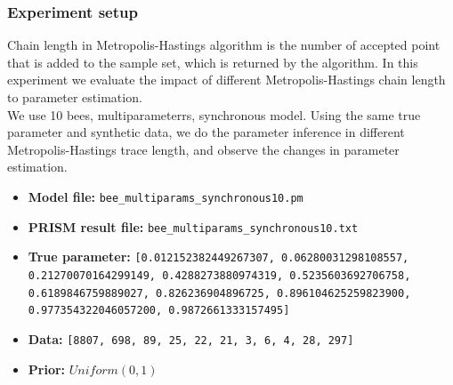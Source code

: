 \documentclass[12pt]{article}
\theoremstyle{definition}
\begin{document}
\subsubsection{Experiment setup}
Chain length in Metropolis-Hastings algorithm is the number of accepted point
that is added to the sample set, which is returned by the algorithm. In this
experiment we evaluate the impact of different Metropolis-Hastings chain length
to parameter estimation.\\
We use 10 bees, multiparameterrs, synchronous model. Using the same true
parameter and synthetic data, we do the parameter inference in different
Metropolis-Hastings trace length, and observe the changes in parameter
estimation.
\begin{itemize}
\item \textbf{Model file:} \texttt{bee\_multiparams\_synchronous10.pm}
\item \textbf{PRISM result file:} \texttt{bee\_multiparams\_synchronous10.txt}
\item \textbf{True parameter:} \texttt{[0.012152382449267307,
    0.06280031298108557, 0.21270070164299149, 0.4288273880974319,
    0.5235603692706758, 0.6189846759889027, 0.826236904896725,
    0.896104625259823900, 0.977354322046057200, 0.9872661333157495]}
\item \textbf{Data: } \texttt{[8807, 698, 89, 25, 22, 21, 3, 6, 4, 28, 297]}
\item \textbf{Prior: } $Uniform(0,1)$
\end{itemize}
\end{document}
